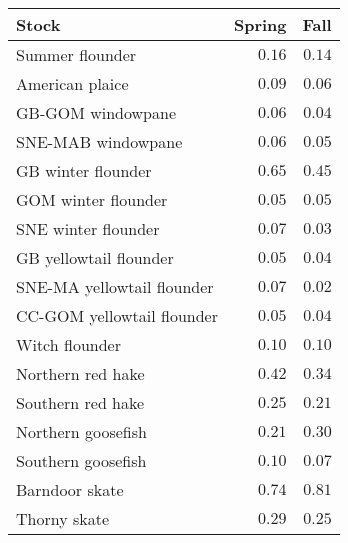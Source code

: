 \begin{center}
\begin{tabular}{lrr}
\hline
\multicolumn{1}{l}{Stock}&\multicolumn{1}{c}{Spring}&\multicolumn{1}{c}{Fall}\tabularnewline
\hline
Summer flounder&$0.16$&$0.14$\tabularnewline
American plaice&$0.09$&$0.06$\tabularnewline
GB-GOM windowpane&$0.06$&$0.04$\tabularnewline
SNE-MAB windowpane&$0.06$&$0.05$\tabularnewline
GB winter flounder&$0.65$&$0.45$\tabularnewline
GOM winter flounder&$0.05$&$0.05$\tabularnewline
SNE winter flounder&$0.07$&$0.03$\tabularnewline
GB yellowtail flounder&$0.05$&$0.04$\tabularnewline
SNE-MA yellowtail flounder&$0.07$&$0.02$\tabularnewline
CC-GOM yellowtail flounder&$0.05$&$0.04$\tabularnewline
Witch flounder&$0.10$&$0.10$\tabularnewline
Northern red hake&$0.42$&$0.34$\tabularnewline
Southern red hake&$0.25$&$0.21$\tabularnewline
Northern goosefish&$0.21$&$0.30$\tabularnewline
Southern goosefish&$0.10$&$0.07$\tabularnewline
Barndoor skate&$0.74$&$0.81$\tabularnewline
Thorny skate&$0.29$&$0.25$\tabularnewline
\hline
\end{tabular}\end{center}
